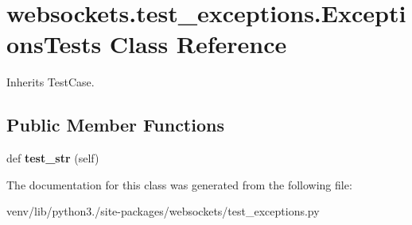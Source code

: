 \hypertarget{classwebsockets_1_1test__exceptions_1_1_exceptions_tests}{}\section{websockets.\+test\+\_\+exceptions.\+Exceptions\+Tests Class Reference}
\label{classwebsockets_1_1test__exceptions_1_1_exceptions_tests}


Inherits Test\+Case.

\subsection*{Public Member Functions}
\begin{DoxyCompactItemize}
\item 
\mbox{\label{classwebsockets_1_1test__exceptions_1_1_exceptions_tests_a5e8277a067f2fc4d6b4022eb9b13607a}} 
def {\bfseries test\+\_\+str} (self)
\end{DoxyCompactItemize}


The documentation for this class was generated from the following file\+:\begin{DoxyCompactItemize}
\item 
venv/lib/python3./site-\/packages/websockets/test\+\_\+exceptions.\+py\end{DoxyCompactItemize}
